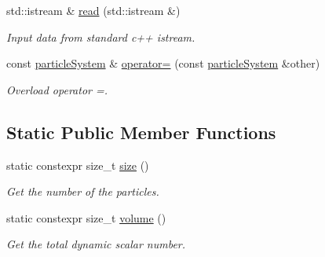 \begin{DoxyCompactItemize}
std\+::istream \& \mbox{\hyperlink{classparticle_system_ade26a52e1b5eae4ba5e37a3e4a3b9cd4}{read}} (std\+::istream \&)
\begin{DoxyCompactList}\small\item\em Input data from standard c++ istream. \end{DoxyCompactList}\item 
const \mbox{\hyperlink{classparticle_system}{particle\+System}} \& \mbox{\hyperlink{classparticle_system_a95f991ac50fde37e7c57dd6feca1e358}{operator=}} (const \mbox{\hyperlink{classparticle_system}{particle\+System}} \&other)
\begin{DoxyCompactList}\small\item\em Overload operator =. \end{DoxyCompactList}\end{DoxyCompactItemize}
\subsection*{Static Public Member Functions}
\begin{DoxyCompactItemize}
\item 
static constexpr size\+\_\+t \mbox{\hyperlink{classparticle_system_add9db06ecfc4ba31291641c5b2157764}{size}} ()
\begin{DoxyCompactList}\small\item\em Get the number of the particles. \end{DoxyCompactList}\item 
static constexpr size\+\_\+t \mbox{\hyperlink{classparticle_system_aac9e6701e4486c89b508a2508b77089b}{volume}} ()
\begin{DoxyCompactList}\small\item\em Get the total dynamic scalar number. \end{DoxyCompactList}\end{DoxyCompactItemize}
